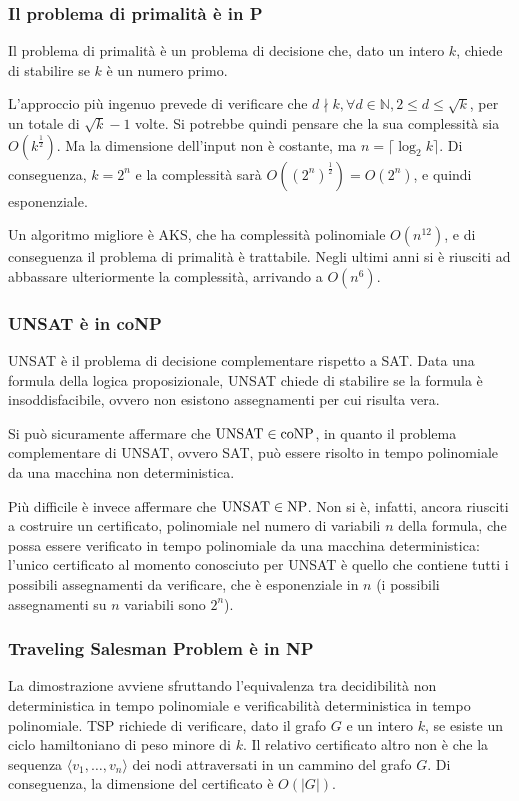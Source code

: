 \subsubsection{Il problema di primalità è in P}
Il problema di primalità è un problema di decisione che, dato un intero $k$, chiede di stabilire se $k$ è un numero primo.

L'approccio più ingenuo prevede di verificare che $d \nmid k, \forall d \in \mathbb{N}, 2 \le d \le \sqrt{k}$, per un totale di $\sqrt{k} - 1$ volte.
Si potrebbe quindi pensare che la sua complessità sia $O(k^{\frac{1}{2}})$. Ma la dimensione dell'input non è costante, ma $n = \lceil \log_2 k \rceil$.
Di conseguenza, $k = 2^n$ e la complessità sarà $O({(2^n)}^\frac{1}{2}) = O(2^n)$, e quindi esponenziale.

Un algoritmo migliore è AKS, che ha complessità polinomiale $O(n^12)$, e di conseguenza il problema di primalità è trattabile.
Negli ultimi anni si è riusciti ad abbassare ulteriormente la complessità, arrivando a $O(n^6)$.

\subsubsection{UNSAT è in coNP}
UNSAT è il problema di decisione complementare rispetto a SAT.
Data una formula della logica proposizionale, UNSAT chiede di stabilire se la formula è insoddisfacibile, ovvero non esistono assegnamenti per cui risulta vera.

Si può sicuramente affermare che $\textnormal{UNSAT} \in \textnormal{coNP}$, in quanto il problema complementare di UNSAT, ovvero SAT, può essere risolto in tempo polinomiale da una macchina non deterministica.

Più difficile è invece affermare che $\textnormal{UNSAT} \in \textnormal{NP}$. Non si è, infatti, ancora riusciti a costruire un certificato, polinomiale nel numero di variabili $n$ della formula, che possa essere verificato in tempo polinomiale da una macchina deterministica: l'unico certificato al momento conosciuto per UNSAT è quello che contiene tutti i possibili assegnamenti da verificare, che è esponenziale in $n$ (i possibili assegnamenti su $n$ variabili sono $2^n$).

\subsubsection{Traveling Salesman Problem è in NP}
La dimostrazione avviene sfruttando l'equivalenza tra decidibilità non deterministica in tempo polinomiale e verificabilità deterministica in tempo polinomiale.
TSP richiede di verificare, dato il grafo $G$ e un intero $k$, se esiste un ciclo hamiltoniano di peso minore di $k$.
Il relativo certificato altro non è che la sequenza $\langle v_1, \ldots, v_n \rangle$ dei nodi attraversati in un cammino del grafo $G$.
Di conseguenza, la dimensione del certificato è $O(|G|)$.

